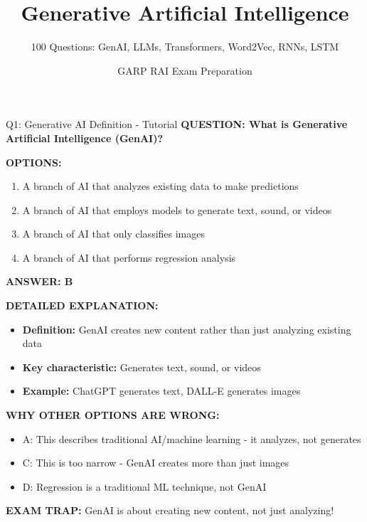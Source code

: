 \documentclass[8pt]{beamer}
\title{Generative Artificial Intelligence}
\subtitle{100 Questions: GenAI, LLMs, Transformers, Word2Vec, RNNs, LSTM}
\author{GARP RAI Exam Preparation}
\date{}
\begin{document}
	
	\begin{frame}
		\titlepage
	\end{frame}
	
	
	\begin{frame}{Q1: Generative AI Definition - Tutorial}
		\fontsize{6.5}{7.5}\selectfont
		\textbf{QUESTION: What is Generative Artificial Intelligence (GenAI)?}
		
		\vspace{0.1cm}
		\textbf{OPTIONS:}
		\begin{enumerate}
			\item A branch of AI that analyzes existing data to make predictions
			\item A branch of AI that employs models to generate text, sound, or videos
			\item A branch of AI that only classifies images
			\item A branch of AI that performs regression analysis
		\end{enumerate}
		
		\vspace{0.1cm}
		\textcolor{myblue}{\textbf{ANSWER: B}}
		
		\vspace{0.1cm}
		\textbf{DETAILED EXPLANATION:}
		\begin{itemize}
			\item \textbf{Definition:} GenAI creates new content rather than just analyzing existing data
			\item \textbf{Key characteristic:} Generates text, sound, or videos
			\item \textbf{Example:} ChatGPT generates text, DALL-E generates images
		\end{itemize}
		
		\vspace{0.1cm}
		\textcolor{myred}{\textbf{WHY OTHER OPTIONS ARE WRONG:}}
		\begin{itemize}
			\item \textcolor{myred}{A:} This describes traditional AI/machine learning - it analyzes, not generates
			\item \textcolor{myred}{C:} This is too narrow - GenAI creates more than just images
			\item \textcolor{myred}{D:} Regression is a traditional ML technique, not GenAI
		\end{itemize}
		
		\textcolor{myred}{\textbf{EXAM TRAP:}} GenAI is about \textcolor{myblue}{creating} new content, not just analyzing!
	\end{frame}
	
\end{document}
